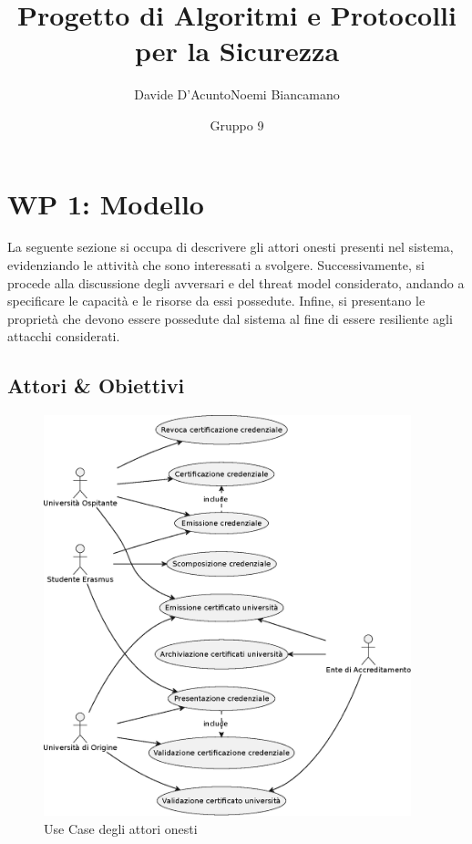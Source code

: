 \documentclass[a4paper,12pt]{article}
\title{Progetto di Algoritmi e Protocolli per la Sicurezza}
\author{Davide D'Acunto\quad Noemi Biancamano}
\date{Gruppo 9}
\begin{document}
\maketitle

\tableofcontents
\newpage
\section{WP 1: Modello}
La seguente sezione si occupa di descrivere gli attori onesti presenti nel sistema, evidenziando le attività che sono interessati a svolgere.
\newline Successivamente, si procede alla discussione degli avversari e del threat model considerato, andando a specificare le capacità e le risorse da essi possedute. Infine, si presentano le proprietà che devono essere possedute dal sistema al fine di essere resiliente agli attacchi considerati.
\subsection{Attori \& Obiettivi}
\begin{figure}[H]
    \centering
    \includegraphics[width=0.95\textwidth]{usecase_1.eps}
    \caption{Use Case degli attori onesti}
    \label{fig:usecase1}
    
\end{figure}
\end{document}
